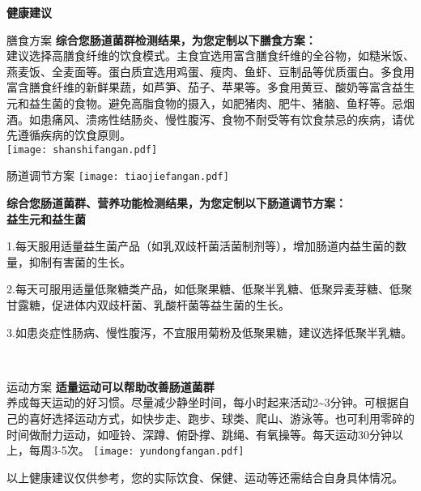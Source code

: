 

\usepackage{graphicx}
\graphicspath{{cores/}}



\vspace*{5mm}
\setlength{\arrayrulewidth}{1pt}
\fontsize{9.3pt}{11pt}\selectfont
\color{gray2}

\centerline{\bf\sanhao 健康建议}

\vspace*{2mm}

\begin{LRaside}[.20]{膳食方案}
{\bf *综合您肠道菌群检测结果，为您定制以下膳食方案：}\\
{\indent 建议选择高膳食纤维的饮食模式。主食宜选用富含膳食纤维的全谷物，如糙米饭、燕麦饭、全麦面等。蛋白质宜选用鸡蛋、瘦肉、鱼虾、豆制品等优质蛋白。多食用富含膳食纤维的新鲜果蔬，如芦笋、茄子、苹果等。多食用黄豆、酸奶等富含益生元和益生菌的食物。避免高脂食物的摄入，如肥猪肉、肥牛、猪脑、鱼籽等。忌烟酒。如患痛风、溃疡性结肠炎、慢性腹泻、食物不耐受等有饮食禁忌的疾病，请优先遵循疾病的饮食原则。}\\
\asidebreak %
\noindent
\texttt{[image: shanshifangan.pdf]}

\end{LRaside}


\begin{LRaside}[.70]{肠道调节方案}
\noindent
\texttt{[image: tiaojiefangan.pdf]}

\asidebreak %
{\bf *综合您肠道菌群、营养功能检测结果，为您定制以下肠道调节方案：}\\
{\bf 益生元和益生菌}\\{\indent 1.每天服用适量益生菌产品（如乳双歧杆菌活菌制剂等），增加肠道内益生菌的数量，抑制有害菌的生长。

2.每天可服用适量低聚糖类产品，如低聚果糖、低聚半乳糖、低聚异麦芽糖、低聚甘露糖，促进体内双歧杆菌、乳酸杆菌等益生菌的生长。 

3.如患炎症性肠病、慢性腹泻，不宜服用菊粉及低聚果糖，建议选择低聚半乳糖。}\\
\end{LRaside}

\begin{LRaside}[.20]{运动方案}
{\bf *适量运动可以帮助改善肠道菌群}\\
{\indent 养成每天运动的好习惯。尽量减少静坐时间，每小时起来活动2\textasciitilde 3分钟。可根据自己的喜好选择运动方式，如快步走、跑步、球类、爬山、游泳等。也可利用零碎的时间做耐力运动，如哑铃、深蹲、俯卧撑、跳绳、有氧操等。每天运动30分钟以上，每周3-5次。}
\asidebreak %
\noindent
\texttt{[image: yundongfangan.pdf]}

\end{LRaside}

{\noindent\qihao *以上健康建议仅供参考，您的实际饮食、保健、运动等还需结合自身具体情况。}



